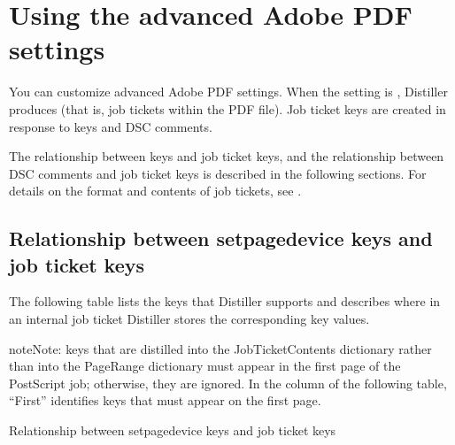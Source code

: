 \documentclass[letterpaper,12pt,english,openany,oneside]{sphinxmanual}
\begin{document}
\section{Using the advanced Adobe PDF settings}
\label{\detokenize{PDF_Create_UsingSettings:using-the-advanced-adobe-pdf-settings}}
You can customize advanced Adobe PDF settings. When the  setting is  , Distiller produces  (that is, job tickets within the PDF file). Job ticket keys are created in response to  keys and DSC comments.

The relationship between  keys and job ticket keys, and the relationship between DSC comments and job ticket keys is described in the following sections. For details on the format and contents of job tickets, see  .


\subsection{Relationship between setpagedevice keys and job ticket keys}
\label{\detokenize{PDF_Create_UsingSettings:relationship-between-setpagedevice-keys-and-job-ticket-keys}}
The following table lists the  keys that Distiller supports and describes where in an internal job ticket Distiller stores the corresponding key values.

\begin{sphinxadmonition}{note}{Note:}
 keys that are distilled into the JobTicketContents dictionary rather than into the PageRange dictionary must appear in the first page of the PostScript job; otherwise, they are ignored. In the  column of the following table, “First” identifies  keys that must appear on the first page.
\end{sphinxadmonition}

Relationship between setpagedevice keys and job ticket keys
\end{document}
